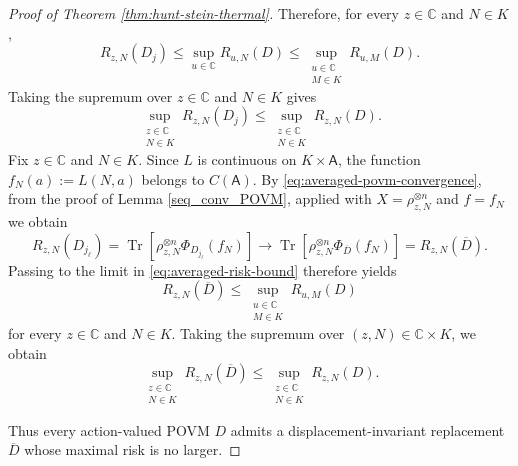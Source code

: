 \documentclass{article}
\theoremstyle{named}
\theoremstyle{named1}
\newcommand{\N}{\mathbb{N}}
\newcommand{\Tr}{\operatorname{Tr}}
\newcommand{\bbC}{\mathbb C}
\theoremstyle{plain}
\theoremstyle{remark}
\begin{document}
\begin{proof}[Proof of Theorem \ref{thm:hunt-stein-thermal}]
Therefore, for every \(z\in\bbC\) and \(N\in K\),
\begin{equation}
    R_{z,N}(D_j)
    \leq
    \sup_{u\in\bbC}R_{u,N}(D)
    \leq
    \sup_{\substack{u\in\bbC\\M\in K}}
    R_{u,M}(D).
    \label{eq:averaged-risk-bound}
\end{equation}
Taking the supremum over \(z\in\bbC\) and \(N\in K\) gives
\begin{equation}
    \sup_{\substack{z\in\bbC\\N\in K}}
    R_{z,N}(D_j)
    \leq
    \sup_{\substack{z\in\bbC\\N\in K}}
    R_{z,N}(D).
    \label{eq:averaged-maximal-risk}
\end{equation}
Fix \(z\in\bbC\) and \(N\in K\). Since \(L\) is continuous on
\(K\times\mathsf A\), the function
$f_N(a):=L(N,a)$
belongs to \(C(\mathsf A)\). By
\eqref{eq:averaged-povm-convergence}, from the proof of Lemma \ref{seq_conv_POVM}, applied with
$X=\rho_{z,N}^{\otimes n}$ and 
    $f=f_N$
we obtain
\begin{equation}
    R_{z,N}(D_{j_\ell})
    =
    \Tr\!\left[
        \rho_{z,N}^{\otimes n}
        \Phi_{D_{j_\ell}}(f_N)
    \right]
    \rightarrow
    \Tr\!\left[
        \rho_{z,N}^{\otimes n}
        \Phi_{\overline D}(f_N)
    \right]
    =
    R_{z,N}(\overline D).
    \label{eq:direct-risk-convergence}
\end{equation}
Passing to the limit in \eqref{eq:averaged-risk-bound} therefore yields
\begin{equation}
    R_{z,N}(\overline D)
    \leq
    \sup_{\substack{u\in\bbC\\M\in K}}
    R_{u,M}(D)
    \label{eq:pointwise-limit-risk-bound}
\end{equation}
for every \(z\in\bbC\) and \(N\in K\). Taking the supremum over
\((z,N)\in\bbC\times K\), we obtain
\begin{equation}
    \sup_{\substack{z\in\bbC\\N\in K}}
    R_{z,N}(\overline D)
    \leq
    \sup_{\substack{z\in\bbC\\N\in K}}
    R_{z,N}(D).
    \label{eq:invariant-risk-improvement}
\end{equation}

Thus every action-valued POVM \(D\) admits a displacement-invariant
replacement \(\overline D\) whose maximal risk is no larger.


\end{proof}
\end{document}
